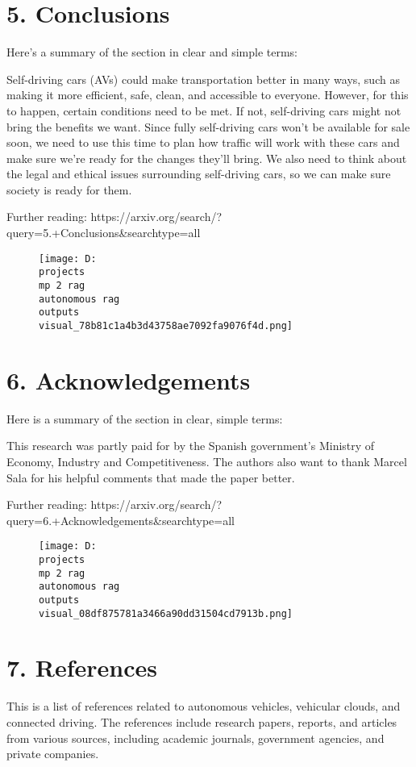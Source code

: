 \documentclass[12pt,a4paper]{article}
\begin{document}
\section{5. Conclusions}
Here's a summary of the section in clear and simple terms:

Self-driving cars (AVs) could make transportation better in many ways, such as making it more efficient, safe, clean, and accessible to everyone. However, for this to happen, certain conditions need to be met. If not, self-driving cars might not bring the benefits we want. Since fully self-driving cars won't be available for sale soon, we need to use this time to plan how traffic will work with these cars and make sure we're ready for the changes they'll bring. We also need to think about the legal and ethical issues surrounding self-driving cars, so we can make sure society is ready for them.

Further reading: https://arxiv.org/search/?query=5.+Conclusions&searchtype=all
\begin{figure}[h]
\centering
\texttt{[image: D:\\projects\\mp 2 rag\\autonomous rag\\outputs\\visual\_78b81c1a4b3d43758ae7092fa9076f4d.png]}
\end{figure}
\section{6. Acknowledgements}
Here is a summary of the section in clear, simple terms:

This research was partly paid for by the Spanish government's Ministry of Economy, Industry and Competitiveness. The authors also want to thank Marcel Sala for his helpful comments that made the paper better.

Further reading: https://arxiv.org/search/?query=6.+Acknowledgements&searchtype=all
\begin{figure}[h]
\centering
\texttt{[image: D:\\projects\\mp 2 rag\\autonomous rag\\outputs\\visual\_08df875781a3466a90dd31504cd7913b.png]}
\end{figure}
\section{7. References}
This is a list of references related to autonomous vehicles, vehicular clouds, and connected driving. The references include research papers, reports, and articles from various sources, including academic journals, government agencies, and private companies.
\end{document}

